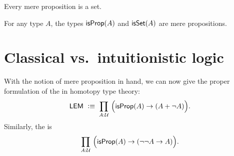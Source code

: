 \documentclass[hott-all.tex]{subfiles}
\begin{document}
\begin{lem}
  Every mere proposition is a set.
\end{lem}
%


\begin{lem}
  For any type $A$, the types $\mathsf{isProp}(A)$ and $\mathsf{isSet}(A)$ are mere propositions.
\end{lem}
%
%
%

\section{Classical vs.\ intuitionistic logic}

With the notion of mere proposition in hand, we can now give the proper formulation of the 
in homotopy type theory:
\begin{equation}
  \fakelabel{eq:lem}
  \LEM{}\;\defeq\;
  \prd{A:\UU} \Big(\isprop(A) \to (A + \neg A)\Big).
\end{equation}
Similarly, the 
is
\begin{equation}
  \fakelabel{eq:ldn}
  \prd{A:\UU} \Big(\isprop(A) \to (\neg\neg A \to A)\Big).
\end{equation}
\end{document}
